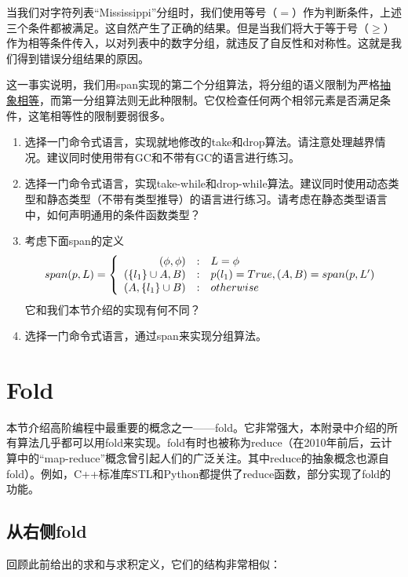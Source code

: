\documentclass[UTF8]{article}
\begin{document}
当我们对字符列表“Mississippi”分组时，我们使用等号（$=$）作为判断条件，上述三个条件都被满足。这自然产生了正确的结果。但是当我们将大于等于号（$\geq$）作为相等条件传入，以对列表中的数字分组，就违反了自反性和对称性。这就是我们得到错误分组结果的原因。

这一事实说明，我们用span实现的第二个分组算法，将分组的语义限制为严格\underline{抽象相等}，而第一分组算法则无此种限制。它仅检查任何两个相邻元素是否满足条件，这笔相等性的限制要弱很多。

\begin{Exercise}
\begin{enumerate}
\item 选择一门命令式语言，实现就地修改的take和drop算法。请注意处理越界情况。建议同时使用带有GC和不带有GC的语言进行练习。
\item 选择一门命令式语言，实现take-while和drop-while算法。建议同时使用动态类型和静态类型（不带有类型推导）的语言进行练习。请考虑在静态类型语言中，如何声明通用的条件函数类型？
\item 考虑下面span的定义
\[
span(p, L) =  \left \{
  \begin{array}
  {r@{\quad:\quad}l}
  (\phi, \phi) & L = \phi \\
  (\{ l_1 \} \cup A, B) & p(l_1) = True, (A, B) = span(p, L') \\
  (A, \{l_1\} \cup B) & otherwise
  \end{array}
\right.
\]
它和我们本节介绍的实现有何不同？
\item 选择一门命令式语言，通过span来实现分组算法。
\end{enumerate}
\end{Exercise}

\section{Fold}

本节介绍高阶编程中最重要的概念之一——fold。它非常强大，本附录中介绍的所有算法几乎都可以用fold来实现。fold有时也被称为reduce（在2010年前后，云计算中的“map-reduce”概念曾引起人们的广泛关注。其中reduce的抽象概念也源自fold）。例如，C++标准库STL和Python都提供了reduce函数，部分实现了fold的功能。

\subsection{从右侧fold}

回顾此前给出的求和与求积定义，它们的结构非常相似：
\end{document}
